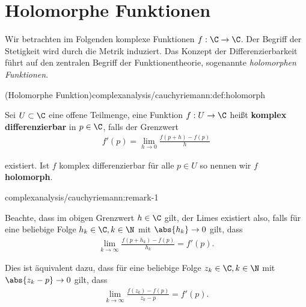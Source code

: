 \documentclass[letterpaper,10pt,german]{jupyterBook}
\begin{document}
\section{Holomorphe Funktionen}
\label{\detokenize{complexanalysis/cauchyriemann:holomorphe-funktionen}}\label{\detokenize{complexanalysis/cauchyriemann::doc}}
\par
Wir betrachten im Folgenden komplexe Funktionen \(f:\C\to\C\). Der Begriff der Stetigkeit wird durch die Metrik induziert. Das Konzept der Differenzierbarkeit führt auf den zentralen Begriff der Funktionentheorie, sogenannte \emph{holomorphen Funktionen}.
\begin{definition}{(Holomorphe Funktion)}{complexanalysis/cauchyriemann:def:holomorph}



\par
Sei \(U \subset \C\) eine offene Teilmenge, eine Funktion \(f:U\to\C\) heißt \textbf{komplex differenzierbar} in \(p\in\C\), falls der Grenzwert
\begin{align*}
f'(p) = \lim_{h\rightarrow 0} \frac{f(p+h) - f(p)}{h}
\end{align*}
\par
existiert. Ist \(f\) komplex differenzierbar für alle \(p\in U\) so nennen wir \(f\) \textbf{holomorph}.
\end{definition}
\begin{remark}{}{complexanalysis/cauchyriemann:remark-1}



\par
Beachte, dass im obigen Grenzwert \(h\in\C\) gilt, der Limes existiert also, falls für eine beliebige Folge \(h_k\in\C,k\in\N\) mit \(\abs{h_k}\to 0\) gilt, dass
\begin{align*}
\lim_{k\to\infty} \frac{f(p+h_k) - f(p)}{h_k} = f'(p).
\end{align*}
\par
Dies ist äquivalent dazu, dass für eine beliebige Folge \(z_k\in\C,k\in\N\) mit \(\abs{z_k-p}\to 0\) gilt, dass
\begin{align*}
\lim_{k\to\infty} \frac{f(z_k) - f(p)}{z_k - p} = f'(p).
\end{align*}\end{remark}
\end{document}
